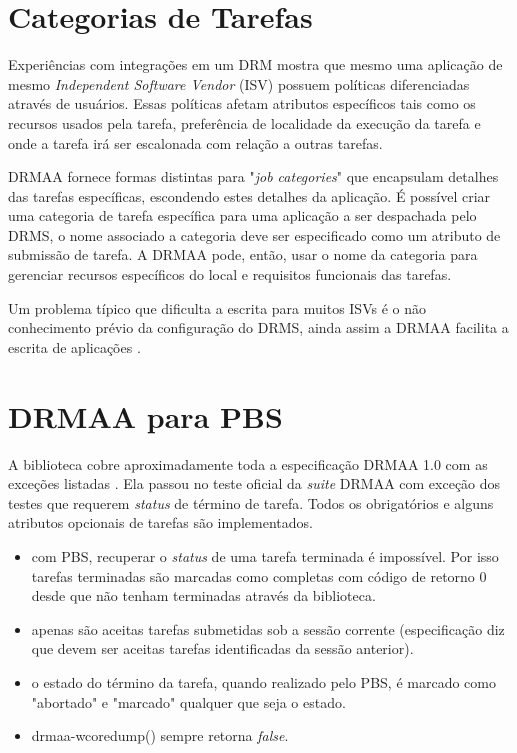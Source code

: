 \section{Categorias de Tarefas}

Experiências com integrações em um DRM mostra que mesmo uma aplicação de mesmo \emph{Independent Software Vendor} (ISV) possuem políticas diferenciadas através de usuários. Essas políticas afetam atributos específicos tais como os recursos usados pela tarefa, preferência de localidade da execução da tarefa e onde a tarefa irá ser escalonada com relação a outras tarefas.

DRMAA fornece formas distintas para "\emph{job categories}" que encapsulam detalhes das tarefas específicas, escondendo estes detalhes da aplicação. É possível criar uma categoria de tarefa específica para uma aplicação a ser despachada pelo DRMS, o nome associado a categoria deve ser especificado como um atributo de submissão de tarefa. A DRMAA pode, então, usar o nome da categoria para gerenciar recursos específicos do local e requisitos funcionais das tarefas.

Um problema típico que dificulta a escrita para muitos ISVs é o não conhecimento prévio da configuração do DRMS, ainda assim a DRMAA facilita a escrita de aplicações \cite{Rajic2002}.

\section{DRMAA para PBS}

A biblioteca cobre aproximadamente toda a especificação DRMAA 1.0 com as exceções listadas \cite{drmaa_pbs}. Ela passou no teste oficial da \emph{suite} DRMAA com exceção dos testes que requerem \emph{status} de término de tarefa. Todos os obrigatórios e alguns atributos opcionais de tarefas são implementados.

\begin{itemize}
	\item com PBS, recuperar o \emph{status} de uma tarefa terminada é impossível. Por isso tarefas terminadas são marcadas como completas com código de retorno 0 desde que não tenham terminadas através da biblioteca.
	\item apenas são aceitas tarefas submetidas sob a sessão corrente (especificação diz que devem ser aceitas tarefas identificadas da sessão anterior).
	\item o estado do término da tarefa, quando realizado pelo PBS, é marcado como "abortado"  e  "marcado" qualquer que seja o estado.
	\item drmaa-wcoredump() sempre retorna \emph{false}.
\end{itemize}

